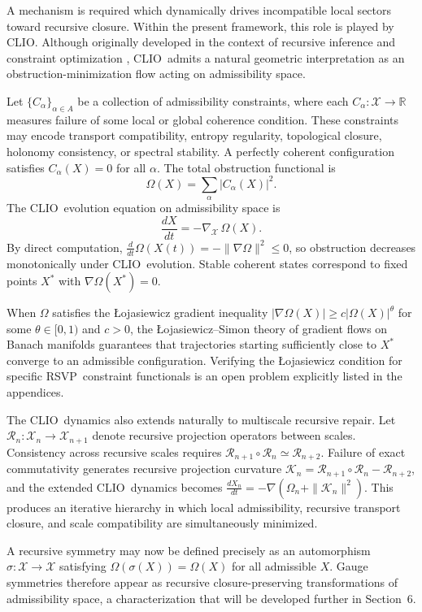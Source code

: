 \documentclass[12pt,a4paper]{article}
\newcommand{\RSVP}{\textrm{RSVP}}
\newcommand{\CLIO}{\textrm{CLIO}}
\newcommand{\Field}{\mathcal{X}}
\newcommand{\R}{\mathbb{R}}
\begin{document}
A mechanism is required which dynamically drives incompatible local sectors
toward recursive closure. Within the present framework, this role is played by
\CLIO. Although originally developed in the context of recursive inference and constraint optimization \cite{Cheng2025}, \CLIO\ admits a natural geometric
interpretation as an obstruction-minimization flow acting on admissibility
space.

Let $\{C_\alpha\}_{\alpha\in A}$ be a collection of admissibility constraints,
where each $C_\alpha:\Field\to\R$ measures failure of some local or global
coherence condition. These constraints may encode transport compatibility,
entropy regularity, topological closure, holonomy consistency, or spectral
stability. A perfectly coherent configuration satisfies $C_\alpha(X)=0$ for all
$\alpha$. The total obstruction functional is
\[
\Omega(X) = \sum_\alpha |C_\alpha(X)|^2.
\]
The \CLIO\ evolution equation on admissibility space is
\[
\frac{dX}{dt} = -\nabla_\Field\,\Omega(X).
\]
By direct computation,
$\frac{d}{dt}\Omega(X(t))=-\|\nabla\Omega\|^2\leq 0$,
so obstruction decreases monotonically under \CLIO\ evolution. Stable coherent
states correspond to fixed points $X^\ast$ with $\nabla\Omega(X^\ast)=0$.

When $\Omega$ satisfies the Łojasiewicz gradient inequality
$|\nabla\Omega(X)|\geq c|\Omega(X)|^\theta$ for some $\theta\in[0,1)$ and
$c>0$, the Łojasiewicz--Simon theory of gradient flows on Banach manifolds
\cite{Lojasiewicz1963,Simon1983} guarantees that trajectories starting
sufficiently close to $X^\ast$ converge to an admissible configuration.
Verifying the Łojasiewicz condition for specific \RSVP\ constraint functionals
is an open problem explicitly listed in the appendices.

The \CLIO\ dynamics also extends naturally to multiscale recursive repair.
Let $\mathcal{R}_n:\Field_n\to\Field_{n+1}$ denote recursive projection
operators between scales. Consistency across recursive scales requires
$\mathcal{R}_{n+1}\circ\mathcal{R}_n\simeq\mathcal{R}_{n+2}$. Failure of exact
commutativity generates recursive projection curvature
$\mathcal{K}_n=\mathcal{R}_{n+1}\circ\mathcal{R}_n-\mathcal{R}_{n+2}$, and the
extended \CLIO\ dynamics becomes
$\frac{dX_n}{dt}=-\nabla(\Omega_n+\|\mathcal{K}_n\|^2)$.
This produces an iterative hierarchy in which local admissibility, recursive
transport closure, and scale compatibility are simultaneously minimized.

A recursive symmetry may now be defined precisely as an automorphism
$\sigma:\Field\to\Field$ satisfying $\Omega(\sigma(X))=\Omega(X)$ for all
admissible $X$. Gauge symmetries therefore appear as recursive
closure-preserving transformations of admissibility space, a characterization
that will be developed further in Section~6.
\end{document}
